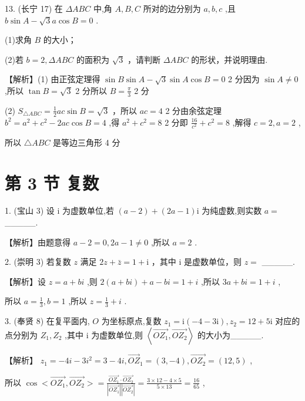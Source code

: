 \documentclass[10pt]{article}
\begin{document}
13. (长宁 17) 在 \({\Delta ABC}\) 中,角 \(A,B,C\) 所对的边分别为 \(a,b,c\) ,且 \(b\sin A - \sqrt{3}a\cos B = 0\) .

(1)求角 \(B\) 的大小；

(2)若 \(b = 2,{\Delta ABC}\) 的面积为 \(\sqrt{3}\) ，请判断 \({\Delta ABC}\) 的形状，并说明理由.

【解析】(1) 由正弦定理得 \(\sin B\sin A - \sqrt{3}\sin A\cos B = 0\) 2 分因为 \(\sin A \neq  0\) ,所以 \(\tan B = \sqrt{3}\) 2 分所以 \(B = \frac{\pi }{3}\) 2 分

(2) \({S}_{\bigtriangleup {ABC}} = \frac{1}{2}{ac}\sin B = \sqrt{3}\) ，所以 \({ac} = 4\) 2 分由余弦定理 \({b}^{2} = {a}^{2} + {c}^{2} - {2ac}\cos B = 4\) ,得 \({a}^{2} + {c}^{2} = 8\) 2 分即 \(\frac{16}{{c}^{2}} + {c}^{2} = 8\) ,解得 \(c = 2,a = 2\) ,

所以 \(\bigtriangleup {ABC}\) 是等边三角形 4 分

\section*{第 3 节 复数}

1. (宝山 3) 设 \(\mathrm{i}\) 为虚数单位,若 \(\left( {a - 2}\right)  + \left( {{2a} - 1}\right) \mathrm{i}\) 为纯虚数,则实数 \(a =\) \_\_\_\_\_.

【解析】由题意得 \(a - 2 = 0,{2a} - 1 \neq  0\) ,所以 \(a = 2\) .

2. (崇明 3) 若复数 \(z\) 满足 \({2z} + \bar{z} = 1 + \mathrm{i}\) ，其中 \(\mathrm{i}\) 是虚数单位，则 \(z =\) \_\_\_\_\_.

【解析】设 \(z = a + {bi}\) ,则 \(2\left( {a + {bi}}\right)  + a - {bi} = 1 + i\) ,所以 \({3a} + {bi} = 1 + i\) ,

所以 \(a = \frac{1}{3},b = 1\) ,所以 \(z = \frac{1}{3} + i\) .

3. (奉贤 8) 在复平面内, \(O\) 为坐标原点,复数 \({z}_{1} = \mathrm{i}\left( {-4 - 3\mathrm{i}}\right) ,{z}_{2} = {12} + 5\mathrm{i}\) 对应的点分别为 \({Z}_{1},{Z}_{2}\) ,其中 \(\mathrm{i}\) 为虚数单位,则 \(\left\langle  {\overrightarrow{O{Z}_{1}},\overrightarrow{O{Z}_{2}}}\right\rangle\) 的大小为\_\_\_\_\_.

【解析】 \({z}_{1} =  - {4i} - 3{i}^{2} = 3 - {4i},{\overrightarrow{OZ}}_{1} = \left( {3, - 4}\right) ,\overrightarrow{O{Z}_{2}} = \left( {{12},5}\right)\) ,

所以 \(\cos  < \overrightarrow{O{Z}_{1}},\overrightarrow{O{Z}_{2}} >  = \frac{\overrightarrow{O{Z}_{1}} \cdot  \overrightarrow{O{Z}_{2}}}{\left| \overrightarrow{O{Z}_{1}}\right| \left| \overrightarrow{O{Z}_{2}}\right| } = \frac{3 \times  {12} - 4 \times  5}{5 \times  {13}} = \frac{16}{65}\) ,
\end{document}
